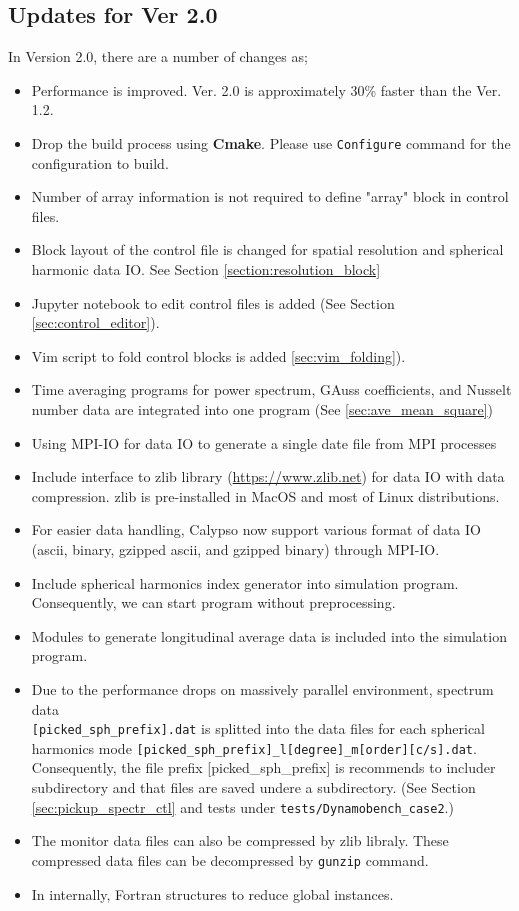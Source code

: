 \subsection{Updates for Ver 2.0}
In Version 2.0, there are a number of changes as;
\begin{itemize}
\item Performance is improved. Ver. 2.0 is approximately 30\% faster than the Ver. 1.2.
\item Drop the build process using {\bf Cmake}. Please use {\tt Configure} command for the configuration to build.
\item Number of array information is not required to define "array" block in control files.
\item Block layout of the control file is changed for spatial resolution and spherical harmonic data IO. See Section \ref{section:resolution_block}

\item Jupyter notebook to edit control files is added (See Section \ref{sec:control_editor}).
\item Vim script to fold control blocks is added  \ref{sec:vim_folding}).
\item Time averaging programs for power spectrum, GAuss coefficients, and Nusselt number data  are integrated into one program (See \ref{sec:ave_mean_square})

\item Using MPI-IO for data IO to generate a single date file from MPI processes
\item Include interface to zlib library (\url{https://www.zlib.net}) for data IO with data compression. zlib is pre-installed in MacOS and most of Linux distributions.
\item For easier data handling, Calypso now support various format of data IO (ascii, binary, gzipped ascii, and gzipped binary) through MPI-IO.
\item Include spherical harmonics index generator into simulation program. Consequently, we can start program without preprocessing.
\item Modules to generate longitudinal average data is included into the simulation program.
\item Due to the performance drops on massively parallel environment, spectrum data \\
{\tt [picked\_sph\_prefix].dat} is splitted into the data files for each spherical harmonics mode {\tt [picked\_sph\_prefix]\_l[degree]\_m[order][c/s].dat}. Consequently, the file prefix [picked\_sph\_prefix] is recommends to includer subdirectory and that files are saved undere a subdirectory. (See Section \ref{sec:pickup_spectr_ctl} and tests under \verb|tests/Dynamobench_case2|.)
\item The monitor data files can also be compressed by zlib libraly. These compressed data files can be decompressed by {\tt gunzip} command.
\item In internally, Fortran structures to reduce global instances.
\end{itemize}







